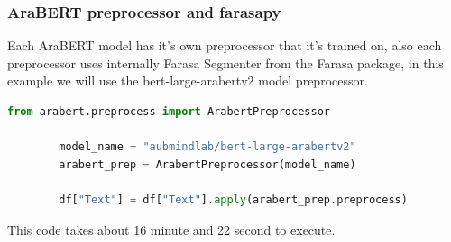\documentclass[12pt]{diazessay}
\begin{document}
        \subsubsection{AraBERT preprocessor and farasapy}
        Each AraBERT  model has it's own preprocessor that it's trained on, also each preprocessor uses internally Farasa Segmenter from the Farasa package, in this example we will use the bert-large-arabertv2 model preprocessor.
        \begin{lstlisting}[language=Python]
        from arabert.preprocess import ArabertPreprocessor
        
        model_name = "aubmindlab/bert-large-arabertv2"
        arabert_prep = ArabertPreprocessor(model_name)
        
        df["Text"] = df["Text"].apply(arabert_prep.preprocess)
        \end{lstlisting}
        This code takes about 16 minute and 22 second to execute.
        
\end{document}
